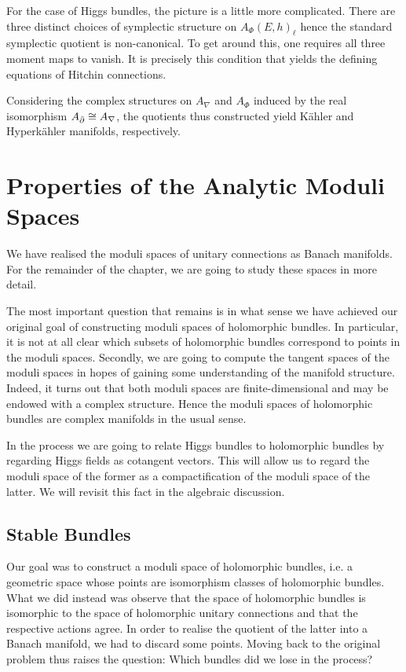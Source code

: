 \documentclass[12pt]{ociamthesis}  %
\begin{document}
For the case of Higgs bundles, the picture is a little more complicated.
There are three distinct choices of symplectic structure on
$A_\Phi(E,h)_\ell$ hence the standard symplectic quotient is non-canonical.
To get around this, one requires all three moment maps to vanish. It is
precisely this condition that yields the defining equations of
Hitchin connections.

Considering the complex structures on $A_\nabla$ and $A_\Phi$ induced
by the real isomorphism $A_{\bar{\partial}}\cong A_\nabla$, the quotients
thus constructed yield K\"ahler and Hyperk\"ahler manifolds, respectively.

\section{Properties of the Analytic Moduli Spaces}\label{sec:properties_of_analytic_spaces}

We have realised the moduli spaces of unitary connections as
Banach manifolds. For the remainder of the chapter, we are going to
study these spaces in more detail.

The most important question that remains is in what sense we have
achieved our original goal of constructing moduli spaces of
holomorphic bundles. In particular, it is not at all clear which subsets
of holomorphic bundles correspond to points in the moduli spaces.
Secondly, we are going to compute the tangent spaces of the moduli
spaces in hopes of gaining some understanding of the manifold structure.
Indeed, it turns out that both moduli spaces are finite-dimensional
and may be endowed with a complex structure. Hence the moduli spaces
of holomorphic bundles are complex manifolds in the usual sense.

In the process we are going to relate Higgs bundles to holomorphic bundles
by regarding Higgs fields as cotangent vectors. This will allow us to
regard the moduli space of the former as a compactification of the moduli
space of the latter. We will revisit this fact in the algebraic discussion.

\subsection{Stable Bundles}\label{sec:analytic_stable_bundles}

Our goal was to construct a moduli space of holomorphic bundles,
i.e. a geometric space whose points are isomorphism classes of
holomorphic bundles. What we did instead was observe that the space
of holomorphic bundles is isomorphic to the space of holomorphic unitary
connections and that the respective actions agree. In order to realise
the quotient of the latter into a Banach manifold, we had to discard
some points. Moving back to the original problem thus raises
the question: Which bundles did we lose in the process?
\end{document}
